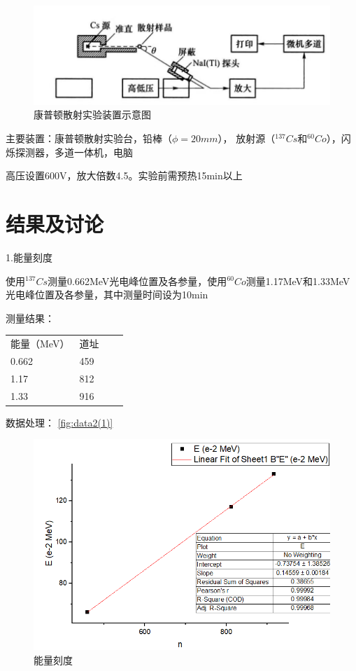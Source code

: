 \documentclass[font=default]{mpltx}
\begin{document}
\begin{figure}
  \centering
  \includegraphics[width=0.85\linewidth]{fig/instrument2.jpg}
  \caption{康普顿散射实验装置示意图}
  \label{sec:instrument2}
\end{figure}

主要装置：康普顿散射实验台，铅棒（$\phi = 20 mm$），
放射源（$ ^{137}{Cs}$和$ ^{60}{Co}$），闪烁探测器，多道一体机，电脑

高压设置600V，放大倍数4.5。实验前需预热15min以上

\section{结果及讨论}
1.能量刻度

使用$ ^{137}{Cs}$测量0.662MeV光电峰位置及各参量，使用$ ^{60}{Co}$测量1.17MeV和1.33MeV光电峰位置及各参量，其中测量时间设为10min

测量结果：

\begin{table}[]
\begin{tabular}{llll}
能量（MeV）                & 道址                  \\
0.662                     & 459                    \\
1.17                      & 812                    \\
1.33                      & 916                     \\
\end{tabular}
\end{table}

数据处理： \autoref{fig:data2(1)}

\begin{figure}
  \centering
  \includegraphics[width=0.85\linewidth]{fig/data2(1).png}
  \caption{能量刻度}
  \label{sec:data2(1)}
\end{figure}
\end{document}
